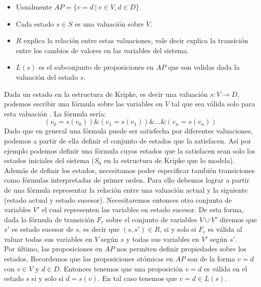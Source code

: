 \documentclass[titlepage, 12pt]{book}
\begin{document}
\begin{itemize}
\item Usualmente  $AP = \{v=d~|~ v \in V, d \in D\}.$
\item Cada estado $s \in S$ es una valuaci\'on sobre $V$.
\item $R$ explica la relaci\'on entre estas valuaciones, vale decir explica la transici\'on entre los cambios de valores en las variables del sistema.
\item $L(s)$ es el subconjunto de proposiciones en $AP$ que son validas dada la valuaci\'on del estado $s$.
\end{itemize}

Dada un estado en la estructura de Kripke, es decir una valuaci\'on $s:V\rightarrow D$, podemos escribir una f\'ormula sobre las variables en $V$ tal que sea v\'alida solo para esta valuaci\'on \cite{Clarke}. La f\'ormula ser\'ia: $$(v_0 = s(v_0)) \& (v_1 = s(v_1)) \& ... \& (v_n = s(v_n))$$
Dado que en general una f\'ormula puede ser satisfecha por diferentes valuaciones, podemos a partir de ella definir el conjunto de estados que la satisfacen. As\'i por ejemplo podemos definir una f\'ormula cuyos estados que la satisfacen sean solo los estados iniciales del sistema ($S_0$ en la estructura de Kripke que lo modela).\\

Adem\'as de definir los estados, necesitamos poder especificar tambi\'en transiciones como f\'ormulas interpretadas de primer orden. Para ello debemos lograr a partir de una f\'ormula representar la relaci\'on entre una valuaci\'on actual y la siguiente (estado actual y estado sucesor). Necesitaremos entonces otro conjunto de variables $V'$ el cual representen las variables en estado sucesor. De esta forma, dada la f\'ormula de transici\'on $F_r$ sobre el conjunto de variables $V \cup V'$ diremos que $s'$ es estado sucesor de $s$, es decir que $(s,s')\in R$, si y solo si $F_r$ es v\'alida al valuar todas sus variables en $V$ seg\'un $s$ y todas sus variables en $V'$ seg\'un $s'$.\\

Por \'ultimo, las proposiciones en $AP$ nos permiten definir propiedades sobre los estados. Recordemos que las proposiciones at\'omicas en $AP$ son de la forma $v=d$ con $v \in V$ y $d \in D$. Entonces tenemos que una proposici\'on $v=d$ es v\'alida en el estado $s$ si y solo si $d = s(v)$. En tal caso tenemos que $v=d \in L(s)$.




\end{document}
